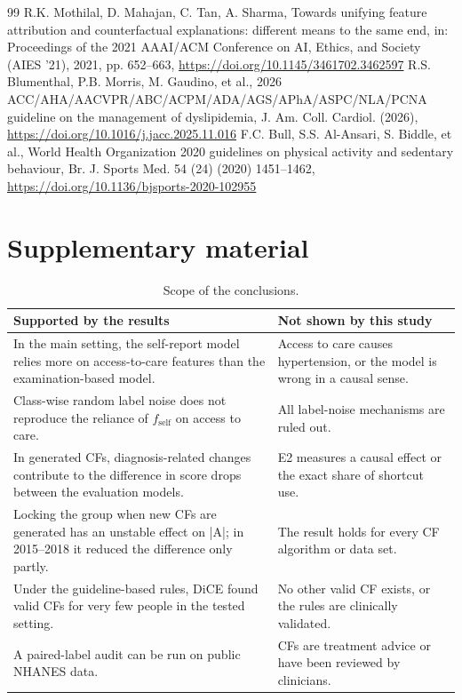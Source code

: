 \documentclass[preprint,review,12pt,times]{elsarticle}
\begin{document}
\begin{thebibliography}{99}
 R.K. Mothilal, D. Mahajan, C. Tan, A. Sharma, Towards unifying feature attribution and counterfactual explanations: different means to the same end, in: Proceedings of the 2021 AAAI/\allowbreak{}ACM Conference on AI, Ethics, and Society (AIES '21), 2021, pp. 652–663, \url{https://doi.org/10.1145/3461702.3462597}
 R.S. Blumenthal, P.B. Morris, M. Gaudino, et al., 2026 ACC/\allowbreak{}AHA/\allowbreak{}AACVPR/\allowbreak{}ABC/\allowbreak{}ACPM/\allowbreak{}ADA/\allowbreak{}AGS/\allowbreak{}APhA/\allowbreak{}ASPC/\allowbreak{}NLA/\allowbreak{}PCNA guideline on the management of dyslipidemia, J. Am. Coll. Cardiol. (2026), \url{https://doi.org/10.1016/j.jacc.2025.11.016}
 F.C. Bull, S.S. Al-Ansari, S. Biddle, et al., World Health Organization 2020 guidelines on physical activity and sedentary behaviour, Br. J. Sports Med. 54 (24) (2020) 1451–1462, \url{https://doi.org/10.1136/bjsports-2020-102955}
\end{thebibliography}
\clearpage
\appendix
\setcounter{table}{0}\setcounter{figure}{0}
\section{Supplementary material}

\begin{table}[!htbp]
\caption{Scope of the conclusions.}
\label{tabA1}
\footnotesize{}\selectfont\renewcommand{\arraystretch}{1.1}
\begin{tabularx}{\textwidth}{>{\raggedright\arraybackslash}X>{\raggedright\arraybackslash}X}
\toprule
\textbf{Supported by the results} & \textbf{Not shown by this study} \\ \midrule
In the main setting, the self-report model relies more on access-to-care features than the examination-based model. & Access to care causes hypertension, or the model is wrong in a causal sense. \\
Class-wise random label noise does not reproduce the reliance of $f_{\mathrm{self}}$ on access to care. & All label-noise mechanisms are ruled out. \\
In generated CFs, diagnosis-related changes contribute to the difference in score drops between the evaluation models. & E2 measures a causal effect or the exact share of shortcut use. \\
Locking the group when new CFs are generated has an unstable effect on |A|; in 2015–2018 it reduced the difference only partly. & The result holds for every CF algorithm or data set. \\
Under the guideline-based rules, DiCE found valid CFs for very few people in the tested setting. & No other valid CF exists, or the rules are clinically validated. \\
A paired-label audit can be run on public NHANES data. & CFs are treatment advice or have been reviewed by clinicians. \\
\bottomrule
\end{tabularx}
\end{table}
\end{document}
